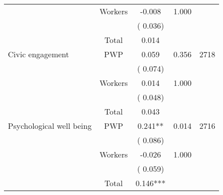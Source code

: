 \begin{tabular}{l*{4}{c}}
                               &       Workers         &             -0.008               &        1.000   &                                               \\ 
                               &                               &       (       0.036)                     & &                                                                             \\ 
\cmidrule{2-3}
                               &       Total           &              0.014               &   &                                               \\ 
\cmidrule{2-3}
 Civic engagement                &       PWP     &              0.059               &        0.356   & 2718                              \\ 
                               &                               &       (       0.074)                     & &                                                                             \\ 
                               &       Workers         &              0.014               &        1.000   &                                               \\ 
                               &                               &       (       0.048)                     & &                                                                             \\ 
\cmidrule{2-3}
                               &       Total           &              0.043               &   &                                               \\ 
\cmidrule{2-3}
 Psychological well being                &       PWP     &              0.241**               &        0.014   & 2716                              \\ 
                               &                               &       (       0.086)                     & &                                                                             \\ 
                               &       Workers         &             -0.026               &        1.000   &                                               \\ 
                               &                               &       (       0.059)                     & &                                                                             \\ 
\cmidrule{2-3}
                               &       Total           &              0.146***               &   &                                               \\ 

\end{tabular}

